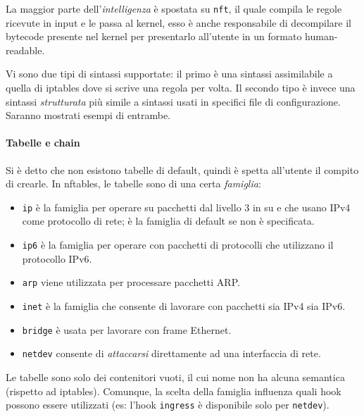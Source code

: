 La maggior parte dell'\textit{intelligenza} è spostata su \texttt{nft}, il quale compila
le regole ricevute in input e le passa al kernel, esso è anche responsabile di
decompilare il bytecode presente nel kernel per presentarlo all'utente in un
formato human-readable.

Vi sono due tipi di sintassi supportate: il primo è una sintassi assimilabile a quella
di iptables dove si scrive una regola per volta. Il secondo tipo è invece
una sintassi \textit{strutturata} più simile a sintassi usati in specifici
file di configurazione. Saranno mostrati esempi di entrambe.


\paragraph{Tabelle e chain}
Si è detto che non esistono tabelle di default, quindi è spetta all'utente
il compito di crearle. In nftables, le tabelle sono di una certa \textit{famiglia}:
\begin{itemize}
	\item \texttt{ip} è la famiglia per operare su pacchetti dal livello 3 in su e
	      che usano IPv4 come protocollo di rete; è la famiglia di default se non è specificata.
	\item \texttt{ip6} è la famiglia per operare con pacchetti di protocolli che utilizzano
	      il protocollo IPv6.
	\item \texttt{arp} viene utilizzata per processare pacchetti ARP.
	\item \texttt{inet} è la famiglia che consente di lavorare con pacchetti sia IPv4
	      sia IPv6.
	\item \texttt{bridge} è usata per lavorare con frame Ethernet.
	\item \texttt{netdev} consente di \textit{attaccarsi} direttamente ad una interfaccia
	      di rete.
\end{itemize}
Le tabelle sono solo dei contenitori vuoti, il cui nome non ha alcuna semantica (rispetto
ad iptables). Comunque, la scelta della famiglia influenza quali hook possono
essere utilizzati (es: l'hook \texttt{ingress} è disponibile solo per \texttt{netdev}).

